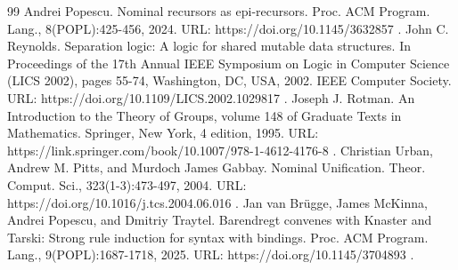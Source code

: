 \begin{thebibliography}{99}
 Andrei Popescu. Nominal recursors as epi-recursors. Proc. ACM Program. Lang., 8(POPL):425-456, 2024. URL: https://doi.org/10.1145/3632857 .
 John C. Reynolds. Separation logic: A logic for shared mutable data structures. In Proceedings of the 17th Annual IEEE Symposium on Logic in Computer Science (LICS 2002), pages 55-74, Washington, DC, USA, 2002. IEEE Computer Society. URL: https://doi.org/10.1109/LICS.2002.1029817 .
 Joseph J. Rotman. An Introduction to the Theory of Groups, volume 148 of Graduate Texts in Mathematics. Springer, New York, 4 edition, 1995. URL: https://link.springer.com/book/10.1007/978-1-4612-4176-8 .
 Christian Urban, Andrew M. Pitts, and Murdoch James Gabbay. Nominal Unification. Theor. Comput. Sci., 323(1-3):473-497, 2004. URL: https://doi.org/10.1016/j.tcs.2004.06.016 .
 Jan van Brügge, James McKinna, Andrei Popescu, and Dmitriy Traytel. Barendregt convenes with Knaster and Tarski: Strong rule induction for syntax with bindings. Proc. ACM Program. Lang., 9(POPL):1687-1718, 2025. URL: https://doi.org/10.1145/3704893 .
\end{thebibliography}
